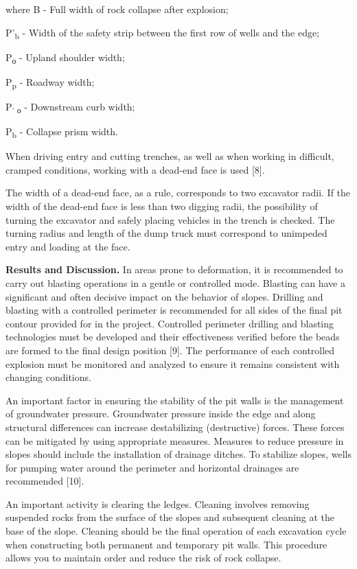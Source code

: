 where B - Full width of rock collapse after explosion;

P'{}\textsubscript{b} - Width of the safety strip between
the first row of wells and the edge;

P\textsubscript{о} - Upland shoulder width;

P\textsubscript{p} - Roadway width;

P\textsubscript{' о} - Downstream curb width;

P\textsubscript{b} - Collapse prism width.

When driving entry and cutting trenches, as well as when working in
difficult, cramped conditions, working with a dead-end face is used
{[}8{]}.

The width of a dead-end face, as a rule, corresponds to two excavator
radii. If the width of the dead-end face is less than two digging radii,
the possibility of turning the excavator and safely placing vehicles in
the trench is checked. The turning radius and length of the dump truck
must correspond to unimpeded entry and loading at the face.

{\bfseries Results and Discussion.} In areas prone to deformation, it is
recommended to carry out blasting operations in a gentle or controlled
mode. Blasting can have a significant and often decisive impact on the
behavior of slopes. Drilling and blasting with a controlled perimeter is
recommended for all sides of the final pit contour provided for in the
project. Controlled perimeter drilling and blasting technologies must be
developed and their effectiveness verified before the beads are formed
to the final design position {[}9{]}. The performance of each controlled
explosion must be monitored and analyzed to ensure it remains consistent
with changing conditions.

An important factor in ensuring the stability of the pit walls is the
management of groundwater pressure. Groundwater pressure inside the edge
and along structural differences can increase destabilizing
(destructive) forces. These forces can be mitigated by using appropriate
measures. Measures to reduce pressure in slopes should include the
installation of drainage ditches. To stabilize slopes, wells for pumping
water around the perimeter and horizontal drainages are recommended
{[}10{]}.

An important activity is clearing the ledges. Cleaning involves removing
suspended rocks from the surface of the slopes and subsequent cleaning
at the base of the slope. Cleaning should be the final operation of each
excavation cycle when constructing both permanent and temporary pit
walls. This procedure allows you to maintain order and reduce the risk
of rock collapse.


